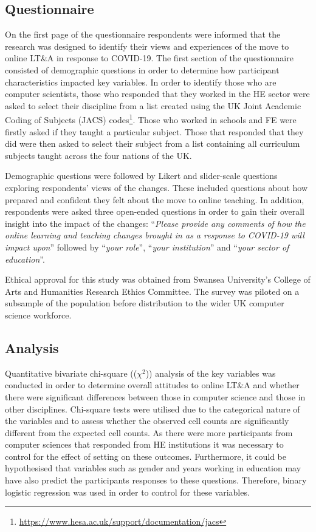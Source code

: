 \documentclass[sigconf]{acmart}
\begin{document}
\subsection{Questionnaire}

On the first page of the questionnaire respondents were informed that
the research was designed to identify their views and experiences of
the move to online LT\&A in response to COVID-19. The first section of
the questionnaire consisted of demographic questions in order to
determine how participant characteristics impacted key variables. In
order to identify those who are computer scientists, those who
responded that they worked in the HE sector were asked to select their
discipline from a list created using the UK Joint Academic Coding of
Subjects (JACS)
codes\footnote{\url{https://www.hesa.ac.uk/support/documentation/jacs}}. Those
who worked in schools and FE were firstly asked if they taught a
particular subject. Those that responded that they did were then asked
to select their subject from a list containing all curriculum subjects
taught across the four nations of the UK.

Demographic questions were followed by Likert and slider-scale
questions exploring respondents' views of the changes. These included
questions about how prepared and confident they felt about the move to
online teaching. In addition, respondents were asked three open-ended questions in
order to gain their overall insight into the impact of the changes:
``{\emph{Please provide any comments of how the online learning and
teaching changes brought in as a response to COVID-19 will impact
upon}}'' followed by ``{\emph{your role}}'', ``{\emph{your
institution}}'' and ``{\emph{your sector of education}}''.

Ethical approval for this study was obtained from Swansea University's
College of Arts and Humanities Research Ethics Committee. The survey
was piloted on a subsample of the population before distribution to
the wider UK computer science workforce.

\subsection{Analysis}

Quantitative bivariate chi-square (($\chi^2$)) analysis of the key
variables was conducted in order to determine overall attitudes to
online LT\&A and whether there were significant differences between
those in computer science and those in other disciplines. Chi-square
tests were utilised due to the categorical nature of the variables and
to assess whether the observed cell counts are significantly different
from the expected cell counts. As there were more participants from
computer sciences that responded from HE institutions it was necessary
to control for the effect of setting on these outcomes. Furthermore,
it could be hypothesised that variables such as gender and years
working in education may have also predict the participants responses
to these questions. Therefore, binary logistic regression was used in
order to control for these variables.
\end{document}
